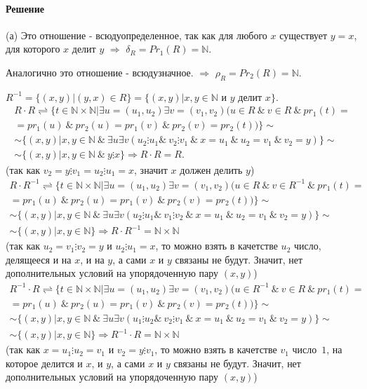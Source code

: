 \documentclass[a4paper,12pt]{article}
\begin{document}
\paragraph*{Решение}
(а) Это отношение - всюдуопределенное, так как для любого $x$ существует $y=x$, для которого $x$ делит $y$ $\Rightarrow$ $\delta_R=Pr_1(R)=\mathbb{N}$.\par
Аналогично это отношение - всюдузначное. $\Rightarrow$ $\rho_R=Pr_2(R)=\mathbb{N}$.\par
$R^{-1} = \{(x,y)|(y,x)\in R\} = \{(x,y)|x,y \in \mathbb{N}$ и $y$ делит $x\}$.
\begin{gather*}
R\cdot R \rightleftharpoons \{t\in \mathbb{N}\times \mathbb{N} | \exists u=(u_1,u_2) \exists v=(v_1,v_2) (u\in R\  \& \ v\in R \ \& \ pr_1(t)=\\
= pr_1(u) \ \& \ pr_2(u)=pr_1(v) \ \& \ pr_2(v)=pr_2(t))\}\sim\\
\sim \{(x,y)|x,y\in \mathbb{N} \ \& \ \exists u \exists v (u_2\vdots u_1  \& \ v_2\vdots v_1 \ \& \ x=u_1 \ \& \ u_2 = v_1 \ \& \ v_2 = y)\} \sim \\
\sim \{(x,y)|x,y\in \mathbb{N} \ \& \ y\vdots x\} \Rightarrow R\cdot R = R.
\end{gather*}
(так как $v_2=y\vdots v_1=u_2\vdots u_1=x$, значит $x$ должен делить $y$)
\begin{gather*}
R\cdot R^{-1} \rightleftharpoons \{t\in \mathbb{N}\times \mathbb{N} | \exists u=(u_1,u_2) \exists v=(v_1,v_2) (u\in R\  \& \ v\in R^{-1} \ \& \ pr_1(t)=\\
= pr_1(u) \ \& \ pr_2(u)=pr_1(v) \ \& \ pr_2(v)=pr_2(t))\}\sim\\
\sim \{(x,y)|x,y\in \mathbb{N} \ \& \ \exists u \exists v (u_2\vdots u_1  \& \ v_1\vdots v_2 \ \& \ x=u_1 \ \& \ u_2 = v_1 \ \& \ v_2 = y)\} \sim \\
\sim \{(x,y)|x,y\in \mathbb{N}\} \Rightarrow R\cdot R^{-1} = \mathbb{N}\times \mathbb{N}
\end{gather*}
(так как $u_2=v_1\vdots v_2=y$ и $u_2\vdots u_1=x$, то можно взять в качетстве $u_2$ число, делящееся и на $x$, и на $y$, а сами $x$ и $y$ связаны не будут. Значит, нет дополнительных условий на упорядоченную пару $(x,y)$)
\begin{gather*}
R^{-1}\cdot R \rightleftharpoons \{t\in \mathbb{N}\times \mathbb{N} | \exists u=(u_1,u_2) \exists v=(v_1,v_2) (u\in R^{-1}\  \& \ v\in R \ \& \ pr_1(t)=\\
= pr_1(u) \ \& \ pr_2(u)=pr_1(v) \ \& \ pr_2(v)=pr_2(t))\}\sim\\
\sim \{(x,y)|x,y\in \mathbb{N} \ \& \ \exists u \exists v (u_1\vdots u_2  \& \ v_2\vdots v_1 \ \& \ x=u_1 \ \& \ u_2 = v_1 \ \& \ v_2 = y)\} \sim \\
\sim \{(x,y)|x,y\in \mathbb{N}\} \Rightarrow R^{-1}\cdot R = \mathbb{N}\times \mathbb{N}
\end{gather*}
(так как $x=u_1\vdots u_2=v_1$ и $v_2=y\vdots v_1$, то можно взять в качетстве $v_1$ число~$1$, на которое делится и $x$, и $y$, а сами $x$ и $y$ связаны не будут. Значит, нет дополнительных условий на упорядоченную пару $(x,y)$)\\
\end{document}
